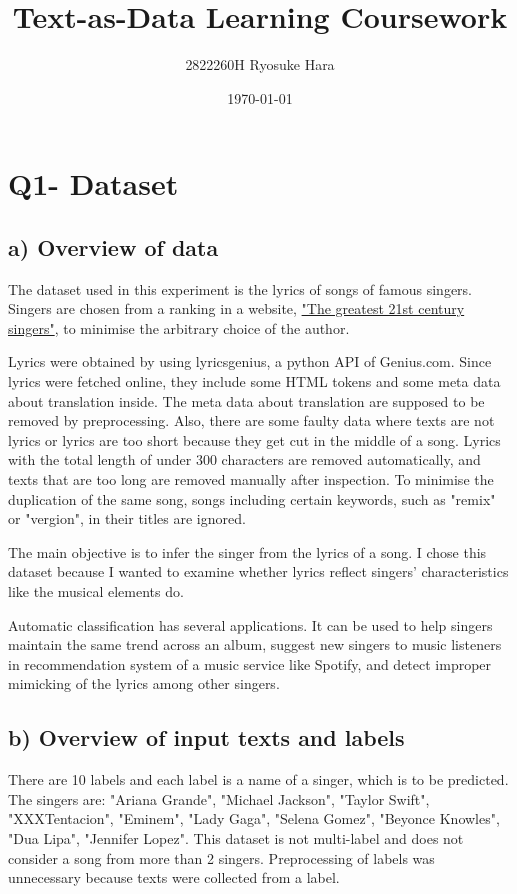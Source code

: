 \documentclass[a4paper,11pt]{article}
\begin{document}
\title{Text-as-Data Learning Coursework}
\author{2822260H Ryosuke Hara}
\date{\today}
\maketitle

\section{Q1- Dataset}
\subsection{a) Overview of data}%
The dataset used in this experiment is the lyrics of songs of famous singers.
Singers are chosen from a ranking in a website, \href{https://www.thefamouspeople.com/21st-century-singers.php}{"The greatest 21st century singers"}, to minimise the arbitrary choice of the author.

Lyrics were obtained by using lyricsgenius, a python API of Genius.com.
Since lyrics were fetched online, they include some HTML tokens and some meta data about translation inside.
The meta data about translation are supposed to be removed by preprocessing.
Also, there are some faulty data where texts are not lyrics or lyrics are too short because they get cut in the middle of a song.
Lyrics with the total length of under 300 characters are removed automatically, and texts that are too long are removed manually after inspection.
To minimise the duplication of the same song, songs including certain keywords, such as "remix" or "vergion", in their titles are ignored.


The main objective is to infer the singer from the lyrics of a song.
I chose this dataset because I wanted to examine whether lyrics reflect singers' characteristics like the musical elements do.

Automatic classification has several applications.
It can be used to help singers maintain the same trend across an album,
suggest new singers to music listeners in recommendation system of a music service like Spotify, and
detect improper mimicking of the lyrics among other singers. 

\subsection{b) Overview of input texts and labels}
There are 10 labels and each label is a name of a singer, which is to be predicted.
The singers are: "Ariana Grande", "Michael Jackson", "Taylor Swift", "XXXTentacion", "Eminem", "Lady Gaga", "Selena Gomez", "Beyonce Knowles", "Dua Lipa",
"Jennifer Lopez".
This dataset is not multi-label and does not consider a song from more than 2 singers.
Preprocessing of labels was unnecessary because texts were collected from a label.
\end{document}
